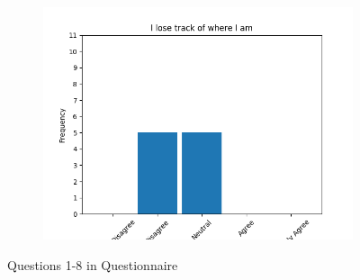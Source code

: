 \documentclass{article}
\begin{document}
\begin{figure}[!ht]
\begin{subfigure}{.5\textwidth}
    \includegraphics[width=\textwidth]{images/questions/7}
\end{subfigure}
\caption[short]{Questions 1-8 in Questionnaire}\label{fig:qfirst}
\end{figure}
\end{document}
